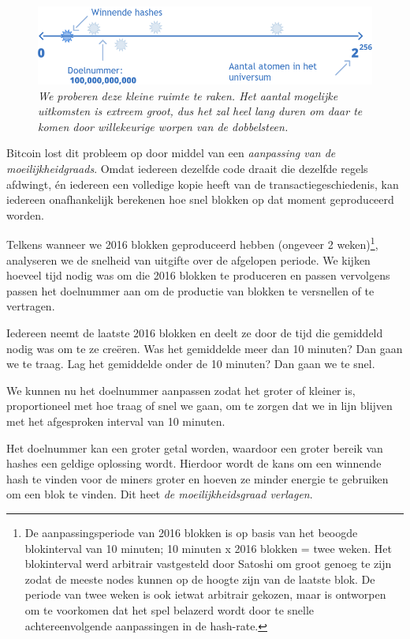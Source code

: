 \documentclass[smalldemyvopaper,11pt,twoside,onecolumn,openright,extrafontsizes]{memoir}
\begin{document}
\begin{figure}
    \centering
    \includegraphics[width=\textwidth]{images/fig5.png}
    \caption{\footnotesize{\textit{We proberen deze kleine ruimte te raken. Het aantal mogelijke uitkomsten is extreem groot, dus het zal heel lang duren om daar te komen door willekeurige worpen van de dobbelsteen.}}}
    \label{fig8}
\end{figure}


Bitcoin lost dit probleem op door middel van een \textit{aanpassing van de moeilijkheidgraads}. Omdat iedereen dezelfde code draait die dezelfde regels afdwingt, én iedereen een volledige kopie heeft van de transactiegeschiedenis, kan iedereen onafhankelijk berekenen hoe snel blokken op dat moment geproduceerd worden.

Telkens wanneer we 2016 blokken geproduceerd hebben (ongeveer 2 weken)\footnote{De aanpassingsperiode van 2016 blokken is op basis van het beoogde blokinterval van 10 minuten; 10 minuten x 2016 blokken = twee weken. Het blokinterval werd arbitrair vastgesteld door Satoshi om groot genoeg te zijn zodat de meeste nodes kunnen op de hoogte zijn van de laatste blok. De periode van twee weken is ook ietwat arbitrair gekozen, maar is ontworpen om te voorkomen dat het spel belazerd wordt door te snelle achtereenvolgende aanpassingen in de hash-rate.}, analyseren we de snelheid van uitgifte over de afgelopen periode. We kijken hoeveel tijd nodig was om die 2016 blokken te produceren en passen vervolgens passen het doelnummer aan om de productie van blokken te versnellen of te vertragen.

Iedereen neemt de laatste 2016 blokken en deelt ze door de tijd die gemiddeld nodig was om te ze creëren. Was het gemiddelde meer dan 10 minuten? Dan gaan we te traag. Lag het gemiddelde onder de 10 minuten? Dan gaan we te snel.

We kunnen nu het doelnummer aanpassen zodat het groter of kleiner is, proportioneel met hoe traag of snel we gaan, om te zorgen dat we in lijn blijven met het afgesproken interval van 10 minuten.

Het doelnummer kan een groter getal worden, waardoor een groter bereik van hashes een geldige oplossing wordt. Hierdoor wordt de kans om een winnende hash te vinden voor de miners groter en hoeven ze minder energie te gebruiken om een blok te vinden. Dit heet \textit{de moeilijkheidsgraad verlagen}.
\end{document}
